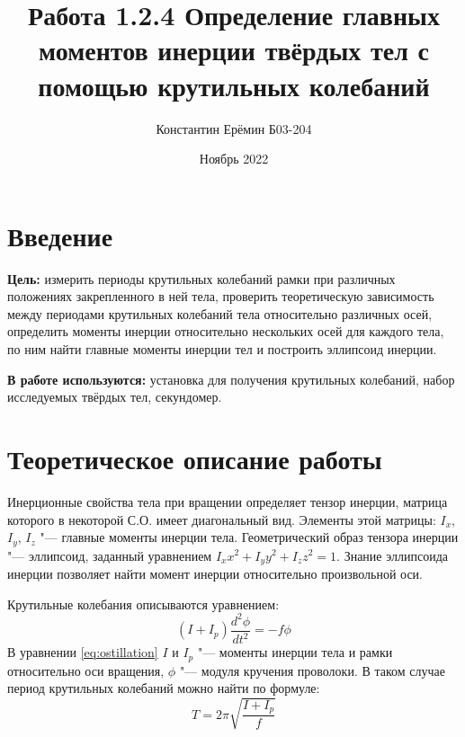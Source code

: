 

\title{\textbf{Работа 1.2.4} \linebreak Определение главных моментов инерции твёрдых тел с помощью крутильных колебаний}
\author{Константин Ерёмин Б03-204}
\date{Ноябрь 2022}


	\maketitle
	
	\section{Введение}
		\textbf{Цель:} измерить периоды крутильных колебаний рамки при различных положениях закрепленного в ней тела, проверить теоретическую зависимость между периодами крутильных колебаний тела относительно различных осей, определить моменты инерции относительно нескольких осей для каждого тела, по ним найти главные моменты инерции тел и построить эллипсоид инерции.
		
		\textbf{В работе используются:} установка для получения крутильных колебаний, набор исследуемых твёрдых тел, секундомер.
		 
	\section{Теоретическое описание работы}
		Инерционные свойства тела при вращении определяет тензор инерции, матрица которого в некоторой С.О. имеет диагональный вид. Элементы этой матрицы: $I_x$, $I_y$, $I_z$ "--- главные моменты инерции тела. Геометрический образ тензора инерции "--- эллипсоид, заданный уравнением $I_xx^2 + I_yy^2 + I_zz^2 = 1$. Знание эллипсоида инерции позволяет найти момент инерции относительно произвольной оси.

		Крутильные колебания описываются уравнением:
		\begin{equation}
			\label{eq:ostillation}
			\left(I+I_p\right)\frac{d^2\phi}{dt^2}=-f\phi
		\end{equation}
		В уравнении \ref{eq:ostillation} $I$ и $I_p$ "--- моменты инерции тела и рамки относительно оси вращения, $\phi$ "--- модуля кручения проволоки. В таком случае период крутильных колебаний можно найти по формуле:
		\begin{equation}
			\label{eq:period}
			T=2\pi\sqrt{\frac{I+I_p}{f}}
		\end{equation}

